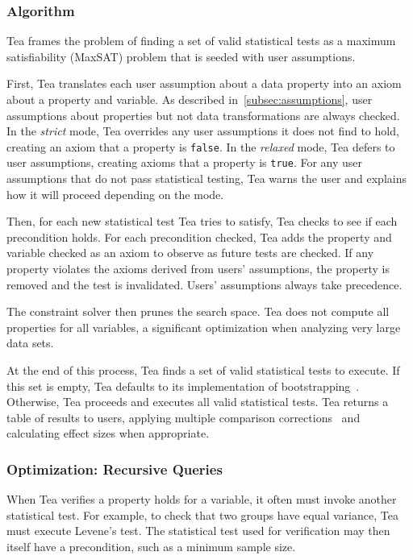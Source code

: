 \vspace{-10pt}
\subsubsection{Algorithm}
Tea frames the problem of finding a set of valid statistical tests as a maximum
satisfiability (MaxSAT) problem that is seeded with user assumptions.

First, Tea translates each user assumption about a data property into an axiom
about a property and variable. As described in~\autoref{subsec:assumptions}, user
assumptions about properties but not data transformations are always checked. In
the \textit{strict} mode, Tea overrides any user assumptions it does not find to
hold, creating an axiom that a property is \texttt{false}. In the \textit{relaxed} mode, Tea
    defers to user assumptions, creating axioms that a property is \texttt{true}. For
any user assumptions that do not pass statistical testing, Tea warns the user and explains
how it will proceed depending on the mode.

Then, for each new statistical test Tea tries to satisfy, Tea checks to see if
each precondition holds. For each precondition checked, Tea adds the property
and variable checked as an axiom to observe as future tests are checked. If any
property violates the axioms derived from users' assumptions, the property is
removed and the test is invalidated. Users' assumptions
always take precedence.


The constraint solver then prunes the search space. Tea does not compute all
properties for all variables, a significant optimization when
analyzing very large data sets.

At the end of this process, Tea finds a set of valid statistical tests
to execute. If this set is empty, Tea defaults to its implementation
of bootstrapping~\cite{efron1992bootstrap}. Otherwise, Tea proceeds
and executes all valid statistical tests. Tea returns a table of
results to users, applying multiple comparison corrections~\cite{holm1979simple} and
calculating effect sizes when appropriate.

\vspace{-10pt}
\subsubsection{Optimization: Recursive Queries}
When Tea verifies a property holds for a variable, it often must invoke another
statistical test. For example, to check that two groups have equal variance,
Tea must execute Levene's test. The statistical test used for
verification may then itself have a precondition, such as a minimum sample size.

